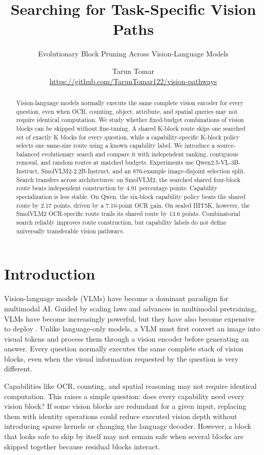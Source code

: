 \documentclass[10pt]{article}
\title{Searching for Task-Specific Vision Paths}
\subtitle{Evolutionary Block Pruning Across Vision-Language Models}
\author{Tarun Tomar\\\small\url{https://github.com/TarunTomar122/vision-pathways}}
\date{}
\begin{document}
\maketitle

\begin{abstract}

Vision-language models normally execute the same complete vision encoder
for every question, even when OCR, counting, object, attribute, and
spatial queries may not require identical computation. We study whether
fixed-budget combinations of vision blocks can be skipped without
fine-tuning. A shared K-block route skips one searched set of exactly K
blocks for every question, while a capability-specific K-block policy
selects one same-size route using a known capability label. We introduce
a source-balanced evolutionary search and compare it with independent
ranking, contiguous removal, and random routes at matched budgets.
Experiments use Qwen2.5-VL-3B-Instruct, SmolVLM2-2.2B-Instruct, and an
876-example image-disjoint selection split. Search transfers across
architectures: on SmolVLM2, the searched shared four-block route beats
independent construction by 4.91 percentage points. Capability
specialization is less stable. On Qwen, the six-block capability policy
beats the shared route by 2.17 points, driven by a 7.10-point OCR gain.
On sealed IIIT5K, however, the SmolVLM2 OCR-specific route trails its
shared route by 13.6 points. Combinatorial search reliably improves
route construction, but capability labels do not define universally
transferable vision pathways.
\end{abstract}

\section{Introduction}\label{introduction}

Vision-language models (VLMs) have become a dominant paradigm for
multimodal AI. Guided by scaling laws and advances in multimodal
pretraining, VLMs have become increasingly powerful, but they have also
become expensive to deploy
\citep{kaplan2020scaling, hoffmann2022training, bai2025qwen25vl}. Unlike
language-only models, a VLM must first convert an image into visual
tokens and process them through a vision encoder before generating an
answer. Every question normally executes the same complete stack of
vision blocks, even when the visual information requested by the
question is very different.

Capabilities like OCR, counting, and spatial reasoning may not require
identical computation. This raises a simple question: does every
capability need every vision block? If some vision blocks are redundant
for a given input, replacing them with identity operations could reduce
executed vision depth without introducing sparse kernels or changing the
language decoder. However, a block that looks safe to skip by itself may
not remain safe when several blocks are skipped together because
residual blocks interact.
\end{document}
